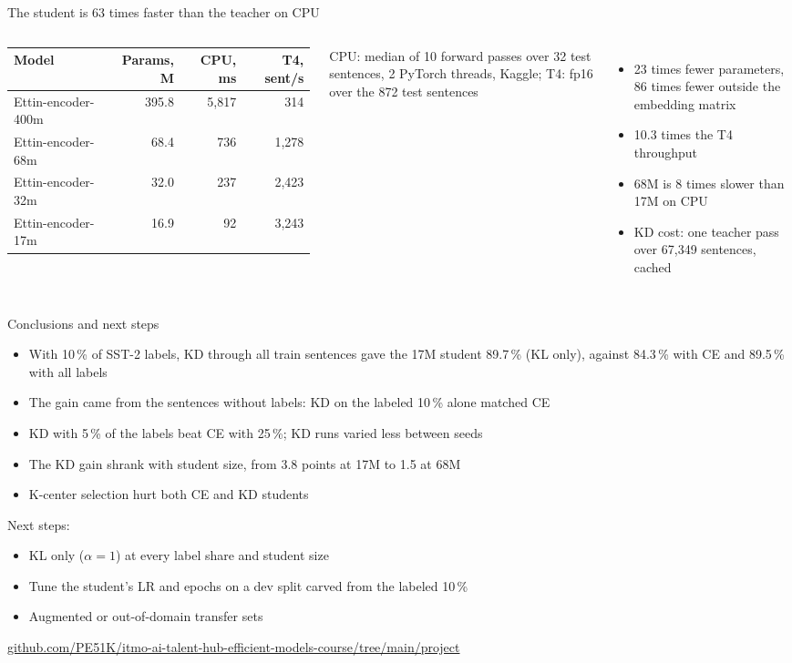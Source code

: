 \documentclass[aspectratio=169,11pt]{beamer}
\begin{document}
\begin{frame}{The student is 63 times faster than the teacher on CPU}
  \begin{columns}[T]
    \footnotesize
    \begin{tabular}{lrrr}
      \toprule
      Model & Params, M & CPU, ms & T4, sent/s \\
      \midrule
      Ettin-encoder-400m & 395.8 & 5,817 & 314 \\
      Ettin-encoder-68m & 68.4 & 736 & 1,278 \\
      Ettin-encoder-32m & 32.0 & 237 & 2,423 \\
      Ettin-encoder-17m & 16.9 & 92 & 3,243 \\
      \bottomrule
    \end{tabular}

    \footnotesize CPU: median of 10 forward passes over 32 test sentences, 2 PyTorch threads, Kaggle; T4: fp16 over the 872 test sentences
    \begin{itemize}
      \item 23 times fewer parameters, 86 times fewer outside the embedding matrix
      \item 10.3 times the T4 throughput
      \item 68M is 8 times slower than 17M on CPU
      \item KD cost: one teacher pass over 67,349 sentences, cached
    \end{itemize}
  \end{columns}
\end{frame}

\begin{frame}{Conclusions and next steps}
  \begin{itemize}
    \item With 10\,\% of SST-2 labels, KD through all train sentences gave the 17M student 89.7\,\% (KL only), against 84.3\,\% with CE and 89.5\,\% with all labels
    \item The gain came from the sentences without labels: KD on the labeled 10\,\% alone matched CE
    \item KD with 5\,\% of the labels beat CE with 25\,\%; KD runs varied less between seeds
    \item The KD gain shrank with student size, from 3.8 points at 17M to 1.5 at 68M
    \item K-center selection hurt both CE and KD students
  \end{itemize}
  \medskip
  Next steps:
  \begin{itemize}
    \item KL only ($\alpha = 1$) at every label share and student size
    \item Tune the student's LR and epochs on a dev split carved from the labeled 10\,\%
    \item Augmented or out-of-domain transfer sets
  \end{itemize}
  \medskip
  \footnotesize \url{github.com/PE51K/itmo-ai-talent-hub-efficient-models-course/tree/main/project}
\end{frame}
\end{document}
